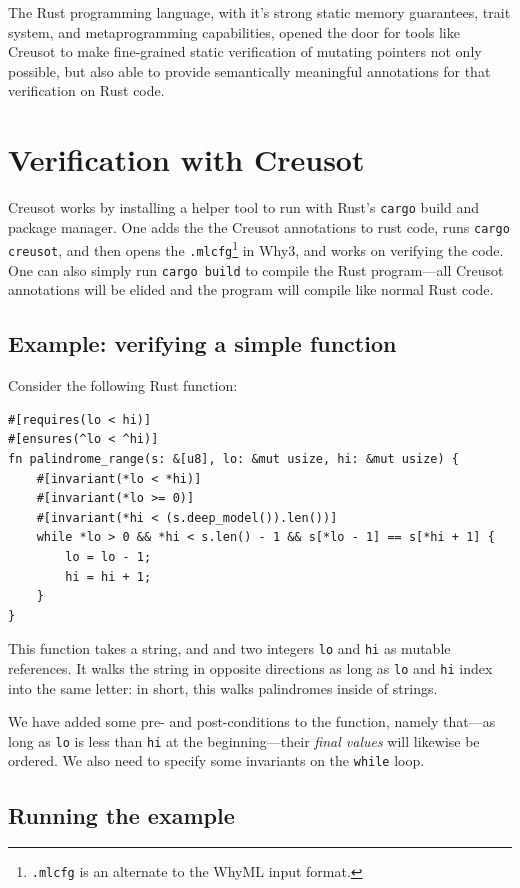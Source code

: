 \documentclass[12pt]{article}
\begin{document}
The Rust programming language, with it's strong static memory guarantees, trait system, and metaprogramming capabilities,
opened the door for tools like Creusot to make fine-grained static verification of mutating pointers not only possible, but also able to provide
semantically meaningful annotations for that verification on Rust code.

\section{Verification with Creusot}

Creusot works by installing a helper tool to run with Rust's \texttt{cargo} build and package manager.
One adds the the Creusot annotations to rust code, runs \texttt{cargo creusot}, and then opens the \texttt{.mlcfg}\footnote{\texttt{.mlcfg} is an alternate to the WhyML input format.} in Why3, and works on verifying the code.
One can also simply run \texttt{cargo build} to compile the Rust program---all Creusot annotations will be elided and the program will compile like normal Rust code.

\subsection{Example: verifying a simple function}

Consider the following Rust function:

\begin{verbatim}
#[requires(lo < hi)]
#[ensures(^lo < ^hi)]
fn palindrome_range(s: &[u8], lo: &mut usize, hi: &mut usize) {
    #[invariant(*lo < *hi)]
    #[invariant(*lo >= 0)]
    #[invariant(*hi < (s.deep_model()).len())]
    while *lo > 0 && *hi < s.len() - 1 && s[*lo - 1] == s[*hi + 1] {
        lo = lo - 1;
        hi = hi + 1;
    }
}
\end{verbatim}

This function takes a string, and and two integers \texttt{lo} and \texttt{hi} as mutable references.
It walks the string in opposite directions as long as \texttt{lo} and \texttt{hi} index into the same letter: in short, this walks palindromes inside of strings.

We have added some pre- and post-conditions to the function, namely that---as long as \texttt{lo} is less than \texttt{hi} at the beginning---their \emph{final values} will likewise be ordered.
We also need to specify some invariants on the \texttt{while} loop.

\subsection{Running the example}
\end{document}
